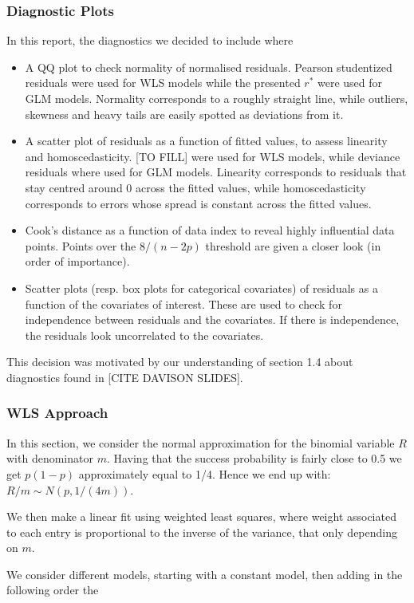 \documentclass[a4paper, 12pt,oneside]{article}
\begin{document}
			\subsubsection{Diagnostic Plots}
				In this report, the diagnostics we decided to include where 
				\begin{itemize}
					\item A QQ plot to check normality of normalised residuals. Pearson studentized residuals were used for WLS models while the presented $r^*$ were used for GLM models. Normality corresponds to a roughly straight line, while outliers, skewness and heavy tails are easily spotted as deviations from it.
					\item A scatter plot of residuals as a function of fitted values, to assess linearity and homoscedasticity. [TO FILL] were used for WLS models, while deviance residuals where used for GLM models. Linearity corresponds to residuals that stay centred around 0 across the fitted values, while homoscedasticity corresponds to errors whose spread is constant across the fitted values.
					\item Cook's distance as a function of data index to reveal highly influential data points. Points over the $8/(n-2p)$ threshold are given a closer look (in order of importance). 
					\item Scatter plots (resp. box plots for categorical covariates) of residuals as a function of the covariates of interest. These are used to check for independence between residuals and the covariates. If there is independence, the residuals look uncorrelated to the covariates. 
				\end{itemize}
				This decision was motivated by our understanding of section 1.4 about diagnostics found in [CITE DAVISON SLIDES]. 
			\subsubsection{WLS Approach}
			In this section, we consider the normal approximation for the binomial variable $R$ with denominator $m$. Having that the success probability is fairly close to 0.5 we get $p(1-p)$ approximately equal to 1/4. Hence we end up with: $R/m \sim N(p,1/(4m))$. 

			We then make a linear fit using weighted least squares, where  weight associated to each entry is proportional to the inverse of the variance, that only depending on $m$.

			We consider different models, starting with a constant model, then adding in the following order the 
\end{document}
